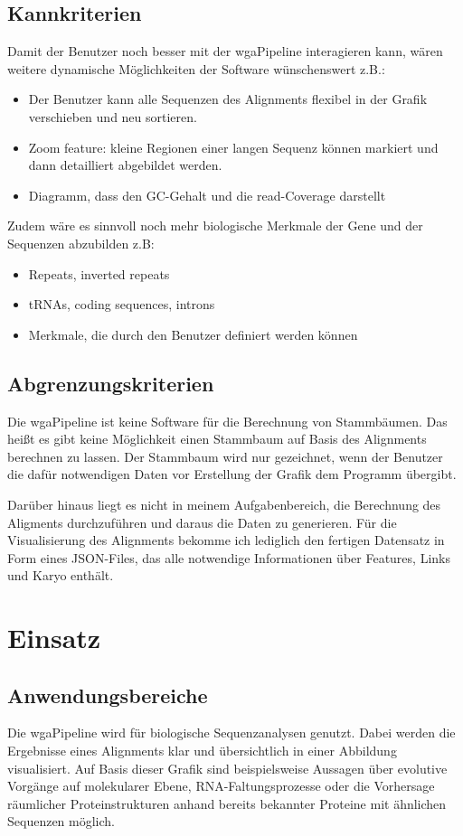 \documentclass[a4paper]{scrreprt}
\begin{document}
\section{Kannkriterien}
Damit der Benutzer noch besser mit der wgaPipeline interagieren kann, wären weitere dynamische Möglichkeiten der Software wünschenswert z.B.:
\begin{itemize}
  \item Der Benutzer kann alle Sequenzen des Alignments flexibel in der Grafik verschieben und neu sortieren.
  \item Zoom feature: kleine Regionen einer langen Sequenz können markiert und dann detailliert abgebildet werden.
  \item Diagramm, dass den GC-Gehalt und die read-Coverage darstellt
\end{itemize}
Zudem wäre es sinnvoll noch mehr biologische Merkmale der Gene und der Sequenzen abzubilden z.B:
\begin{itemize}
  \item Repeats, inverted repeats 
  \item tRNAs, coding sequences, introns
  \item Merkmale, die durch den Benutzer definiert werden können
\end{itemize}

\newpage
\section{Abgrenzungskriterien}
Die wgaPipeline ist keine Software für die Berechnung von Stammbäumen. Das heißt es gibt keine Möglichkeit einen Stammbaum auf Basis des Alignments berechnen zu lassen. Der Stammbaum wird nur gezeichnet, wenn der Benutzer die dafür notwendigen Daten vor Erstellung der Grafik dem Programm übergibt.

Darüber hinaus liegt es nicht in meinem Aufgabenbereich, die Berechnung des Aligments durchzuführen und daraus die Daten zu generieren. Für die Visualisierung des Alignments bekomme ich lediglich den fertigen Datensatz in Form eines JSON-Files, das alle notwendige Informationen über Features, Links und Karyo enthält.

\chapter{Einsatz} 
\section{Anwendungsbereiche}
Die wgaPipeline wird für biologische Sequenzanalysen genutzt. Dabei werden die Ergebnisse eines Alignments klar und übersichtlich in einer Abbildung visualisiert. Auf Basis dieser Grafik sind beispielsweise Aussagen über evolutive Vorgänge auf molekularer Ebene, RNA-Faltungsprozesse oder die Vorhersage räumlicher Proteinstrukturen anhand bereits bekannter Proteine mit ähnlichen Sequenzen möglich. 
\end{document}
